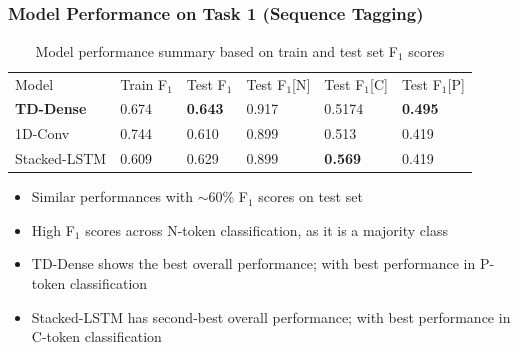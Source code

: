 \documentclass{beamer}
\begin{document}
\subsection{}
\begin{framefont}{\footnotesize}
	\begin{frame}
		\frametitle{Model Performance on Task 1 (Sequence Tagging)}
    \begin{table}[]
    \begin{tabular}{|l|l|l|l|l|l|}
    \cline{1-6}
    Model & Train F$_1$ & Test F$_1$ & Test F$_1$[N] & Test F$_1$[C] & Test F$_1$[P]\\ \hhline{|=|=|=|=|=|=|}
    \textbf{TD-Dense} & 0.674 & \textbf{0.643} & 0.917 & 0.5174 & \textbf{0.495} \\ \cline{1-6}
    1D-Conv & 0.744 & 0.610 & 0.899 & 0.513 & 0.419 \\ \cline{1-6}
    Stacked-LSTM & 0.609 & 0.629 & 0.899 & \textbf{0.569} & 0.419 \\ \cline{1-6}
    \end{tabular}
    \caption{Model performance summary based on train and test set F$_1$ scores}
    \end{table}
    \begin{itemize}
    	\setlength\itemsep{0.8em}
        \item Similar performances with $\sim 60 \%$ F$_1$ scores on test set
        \item High F$_1$ scores across N-token classification, as it is a majority class
        \item TD-Dense shows the best overall performance; with best performance in P-token classification
        \item Stacked-LSTM has second-best overall performance; with best performance in C-token classification
    \end{itemize}
	\end{frame}
\end{framefont}
\end{document}
